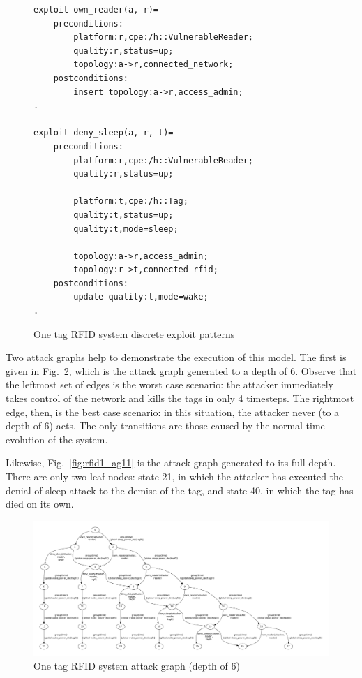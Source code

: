 \begin{figure}
\begin{lstlisting}
exploit own_reader(a, r)=
    preconditions:
        platform:r,cpe:/h::VulnerableReader;
        quality:r,status=up;
        topology:a->r,connected_network;
    postconditions:
        insert topology:a->r,access_admin;
.

exploit deny_sleep(a, r, t)=
    preconditions:
        platform:r,cpe:/h::VulnerableReader;
        quality:r,status=up;
        
        platform:t,cpe:/h::Tag;
        quality:t,status=up;
        quality:t,mode=sleep;
        
        topology:a->r,access_admin;
        topology:r->t,connected_rfid;
    postconditions:
        update quality:t,mode=wake;
.
\end{lstlisting}
\caption{One tag RFID system discrete exploit patterns}
\label{fig:rfid1_token_xp}
\end{figure}

Two attack graphs help to demonstrate the execution of this model. The first is
given in Fig.~\ref{fig:rfid1_ag6}, which is the attack graph generated to a
depth of 6. Observe that the leftmost set of edges is the worst case
scenario: the attacker immediately takes control of the network and kills
the tags in only 4 timesteps. The rightmost edge, then, is the best case
scenario: in this situation, the attacker never (to a
depth of 6) acts. The only transitions are those caused by the normal
time evolution of the system.

Likewise, Fig.~\ref{fig:rfid1_ag11} is the attack graph generated to its
full depth. There are only two leaf nodes: state 21, in which the attacker
has executed the denial of sleep attack to the demise of the tag, and state
40, in which the tag has died on its own.

\begin{figure}
\centering
\includegraphics[angle=90,height=0.9\textheight]{ag_dash7/sleep_ag_6}
\caption{One tag RFID system attack graph (depth of 6)}
\label{fig:rfid1_ag6}
\end{figure}

